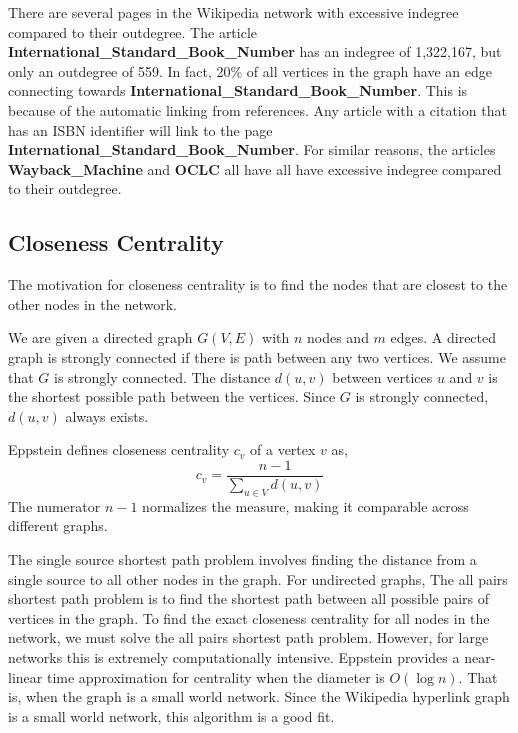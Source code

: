 \documentclass{article}
\begin{document}
There are several pages in the Wikipedia network with excessive indegree compared to their outdegree. 
The article \textbf{International\_Standard\_Book\_Number} has an indegree of 1,322,167, but only an outdegree of 559. In fact, 20\% of all vertices in the graph have an edge connecting towards \textbf{International\_Standard\_Book\_Number}.
This is because of the automatic linking from references.
Any article with a citation that has an ISBN identifier will link to the page \textbf{International\_Standard\_Book\_Number}.
For similar reasons, the articles \textbf{Wayback\_Machine} and \textbf{OCLC} all have all have excessive indegree compared to their outdegree.



\subsection{Closeness Centrality}


The motivation for closeness centrality is to find the nodes that are closest to the other nodes in the network.

We are given a directed graph $G(V,E)$ with $n$ nodes and $m$ edges.
A directed graph is strongly connected if there is path between any two vertices. We assume that $G$ is strongly connected.
The distance $d(u, v)$ between vertices $u$ and $v$ is the shortest possible path between the vertices. Since $G$ is strongly connected, $d(u, v)$ always exists.


Eppstein defines closeness centrality $c_v$ of a vertex $v$ as,
\begin{equation*}
    c_v = \frac{n-1}{\sum_{u \in V}d(u,v)}
\end{equation*} 
The numerator $n-1$ normalizes the measure, making it comparable across different graphs.


The single source shortest path problem involves finding the distance from a single source to all other nodes in the graph. For undirected graphs, 
The all pairs shortest path problem is to find the shortest path between all possible pairs of vertices in the graph.
To find the exact closeness centrality for all nodes in the network, we must solve the all pairs shortest path problem. However, for large networks this is extremely computationally intensive. 
Eppstein provides a near-linear time approximation for centrality when the diameter is $O(\log n)$. That is, when the graph is a small world network. Since the Wikipedia hyperlink graph is a small world network, this algorithm is a good fit.
\end{document}
